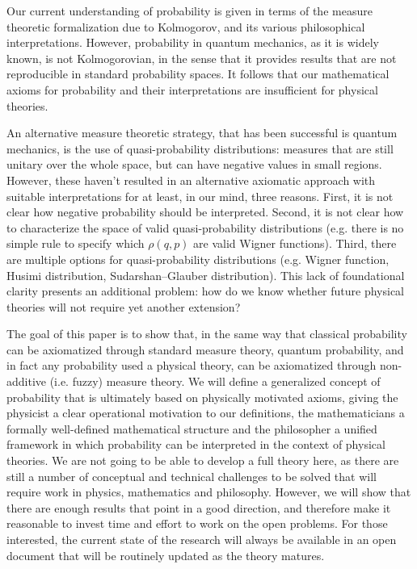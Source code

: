 \documentclass[10pt,twocolumn, nofootinbib]{revtex4-2}
\begin{document}
Our current understanding of probability is given in terms of the measure theoretic formalization due to Kolmogorov, and its various philosophical interpretations. However, probability in quantum mechanics, as it is widely known, is not Kolmogorovian, in the sense that it provides results that are not reproducible in standard probability spaces. It follows that our mathematical axioms for probability and their interpretations are insufficient for physical theories.

An alternative measure theoretic strategy, that has been successful is quantum mechanics, is the use of quasi-probability distributions: measures that are still unitary over the whole space, but can have negative values in small regions. However, these haven't resulted in an alternative axiomatic approach with suitable interpretations for at least, in our mind, three reasons. First, it is not clear how negative probability should be interpreted. Second, it is not clear how to characterize the space of valid quasi-probability distributions (e.g. there is no simple rule to specify which $\rho(q,p)$ are valid Wigner functions). Third, there are multiple options for quasi-probability distributions (e.g. Wigner function, Husimi distribution, Sudarshan–Glauber distribution). This lack of foundational clarity presents an additional problem: how do we know whether future physical theories will not require yet another extension?

The goal of this paper is to show that, in the same way that classical probability can be axiomatized through standard measure theory, quantum probability, and in fact any probability used a physical theory, can be axiomatized through non-additive (i.e. fuzzy) measure theory. We will define a generalized concept of probability that is ultimately based on physically motivated axioms, giving the physicist a clear operational motivation to our definitions, the mathematicians a formally well-defined mathematical structure and the philosopher a unified framework in which probability can be interpreted in the context of physical theories. We are not going to be able to develop a full theory here, as there are still a number of conceptual and technical challenges to be solved that will require work in physics, mathematics and philosophy. However, we will show that there are enough results that point in a good direction, and therefore make it reasonable to invest time and effort to work on the open problems. For those interested, the current state of the research will always be available in an open document that will be routinely updated as the theory matures.
\end{document}
